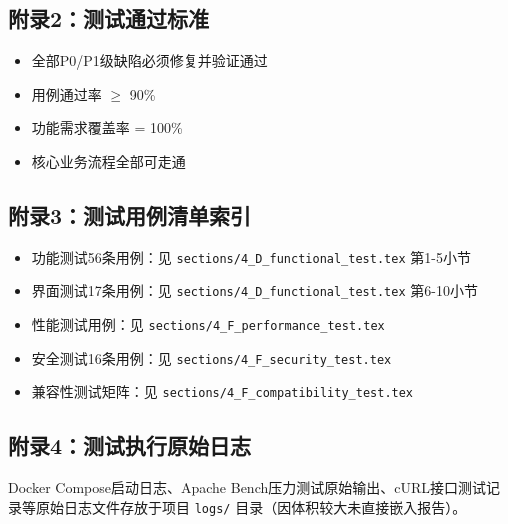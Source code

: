 \subsection{附录2：测试通过标准}
\begin{itemize}
    \item 全部P0/P1级缺陷必须修复并验证通过
    \item 用例通过率 $\ge$ 90\%
    \item 功能需求覆盖率 = 100\%
    \item 核心业务流程全部可走通
\end{itemize}

\subsection{附录3：测试用例清单索引}
\begin{itemize}
    \item 功能测试56条用例：见 \texttt{sections/4\_D\_functional\_test.tex} 第1-5小节
    \item 界面测试17条用例：见 \texttt{sections/4\_D\_functional\_test.tex} 第6-10小节
    \item 性能测试用例：见 \texttt{sections/4\_F\_performance\_test.tex}
    \item 安全测试16条用例：见 \texttt{sections/4\_F\_security\_test.tex}
    \item 兼容性测试矩阵：见 \texttt{sections/4\_F\_compatibility\_test.tex}
\end{itemize}

\subsection{附录4：测试执行原始日志}
Docker Compose启动日志、Apache Bench压力测试原始输出、cURL接口测试记录等原始日志文件存放于项目 \texttt{logs/} 目录（因体积较大未直接嵌入报告）。
